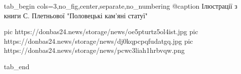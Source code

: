  
 
 
 
 


\ifcmt
  tab_begin cols=3,no_fig,center,separate,no_numbering
		 @caption Ілюстрації з книги С. Плетньової "Половецькі кам'яні статуї"

     pic https://donbas24.news/storage/news/oe5pturtz5ol4ist.jpg
		 pic https://donbas24.news/storage/news/dj0kqpcpqfudatgq.jpg
		 pic https://donbas24.news/storage/news/pcwc3liah1hrbvqw.png

  tab_end
\fi
